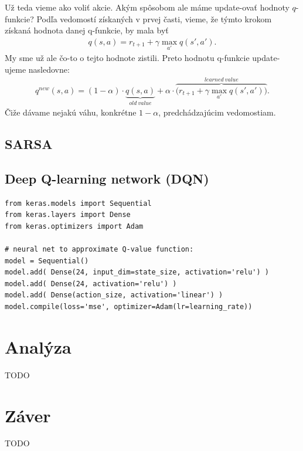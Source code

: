 \documentclass[letterpaper,12pt]{article}
\begin{document}
Už teda vieme ako voliť akcie. Akým spôsobom ale máme update-ovať hodnoty $q$-funkcie?
Podľa vedomostí získaných v prvej časti, vieme, že týmto krokom získaná hodnota danej q-funkcie, by mala byť
\begin{align*}
q(s,a) = r_{t+1} + \gamma \max\limits_{a'} q(s',a').
\end{align*}
My sme už ale čo-to o tejto hodnote zistili. Preto hodnotu q-funkcie update-ujeme nasledovne:
\begin{align*}
q^{new}(s,a) = (1 - \alpha) \cdot \underbrace{q(s,a)}_{old~value} + \alpha \cdot \overbrace{\big(r_{t+1} + \gamma \max\limits_{a'} q(s',a')\big)}^{learned~value}.
\end{align*} 
Čiže dávame nejakú váhu, konkrétne $1- \alpha$, predchádzajúcim vedomostiam.

\subsection{SARSA}
\subsection{Deep Q-learning network (DQN)}

\vspace{0.5cm}
\begin{verbatim}
from keras.models import Sequential
from keras.layers import Dense
from keras.optimizers import Adam

# neural net to approximate Q-value function:
model = Sequential()
model.add( Dense(24, input_dim=state_size, activation='relu') )
model.add( Dense(24, activation='relu') )
model.add( Dense(action_size, activation='linear') )
model.compile(loss='mse', optimizer=Adam(lr=learning_rate))
\end{verbatim}




\section{Analýza}
TODO

\section{Záver}
TODO

\end{document}

